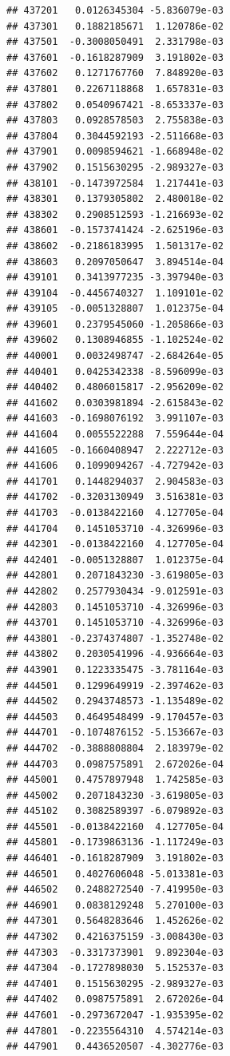 \documentclass[ignorenonframetext,]{beamer}
\begin{document}
\begin{frame}[fragile]
\begin{verbatim}
## 437201   0.0126345304 -5.836079e-03
## 437301   0.1882185671  1.120786e-02
## 437501  -0.3008050491  2.331798e-03
## 437601  -0.1618287909  3.191802e-03
## 437602   0.1271767760  7.848920e-03
## 437801   0.2267118868  1.657831e-03
## 437802   0.0540967421 -8.653337e-03
## 437803   0.0928578503  2.755838e-03
## 437804   0.3044592193 -2.511668e-03
## 437901   0.0098594621 -1.668948e-02
## 437902   0.1515630295 -2.989327e-03
## 438101  -0.1473972584  1.217441e-03
## 438301   0.1379305802  2.480018e-02
## 438302   0.2908512593 -1.216693e-02
## 438601  -0.1573741424 -2.625196e-03
## 438602  -0.2186183995  1.501317e-02
## 438603   0.2097050647  3.894514e-04
## 439101   0.3413977235 -3.397940e-03
## 439104  -0.4456740327  1.109101e-02
## 439105  -0.0051328807  1.012375e-04
## 439601   0.2379545060 -1.205866e-03
## 439602   0.1308946855 -1.102524e-02
## 440001   0.0032498747 -2.684264e-05
## 440401   0.0425342338 -8.596099e-03
## 440402   0.4806015817 -2.956209e-02
## 441602   0.0303981894 -2.615843e-02
## 441603  -0.1698076192  3.991107e-03
## 441604   0.0055522288  7.559644e-04
## 441605  -0.1660408947  2.222712e-03
## 441606   0.1099094267 -4.727942e-03
## 441701   0.1448294037  2.904583e-03
## 441702  -0.3203130949  3.516381e-03
## 441703  -0.0138422160  4.127705e-04
## 441704   0.1451053710 -4.326996e-03
## 442301  -0.0138422160  4.127705e-04
## 442401  -0.0051328807  1.012375e-04
## 442801   0.2071843230 -3.619805e-03
## 442802   0.2577930434 -9.012591e-03
## 442803   0.1451053710 -4.326996e-03
## 443701   0.1451053710 -4.326996e-03
## 443801  -0.2374374807 -1.352748e-02
## 443802   0.2030541996 -4.936664e-03
## 443901   0.1223335475 -3.781164e-03
## 444501   0.1299649919 -2.397462e-03
## 444502   0.2943748573 -1.135489e-02
## 444503   0.4649548499 -9.170457e-03
## 444701  -0.1074876152 -5.153667e-03
## 444702  -0.3888808804  2.183979e-02
## 444703   0.0987575891  2.672026e-04
## 445001   0.4757897948  1.742585e-03
## 445002   0.2071843230 -3.619805e-03
## 445102   0.3082589397 -6.079892e-03
## 445501  -0.0138422160  4.127705e-04
## 445801  -0.1739863136 -1.117249e-03
## 446401  -0.1618287909  3.191802e-03
## 446501   0.4027606048 -5.013381e-03
## 446502   0.2488272540 -7.419950e-03
## 446901   0.0838129248  5.270100e-03
## 447301   0.5648283646  1.452626e-02
## 447302   0.4216375159 -3.008430e-03
## 447303  -0.3317373901  9.892304e-03
## 447304  -0.1727898030  5.152537e-03
## 447401   0.1515630295 -2.989327e-03
## 447402   0.0987575891  2.672026e-04
## 447601  -0.2973672047 -1.935395e-02
## 447801  -0.2235564310  4.574214e-03
## 447901   0.4436520507 -4.302776e-03

\end{verbatim}
\end{frame}
\end{document}
